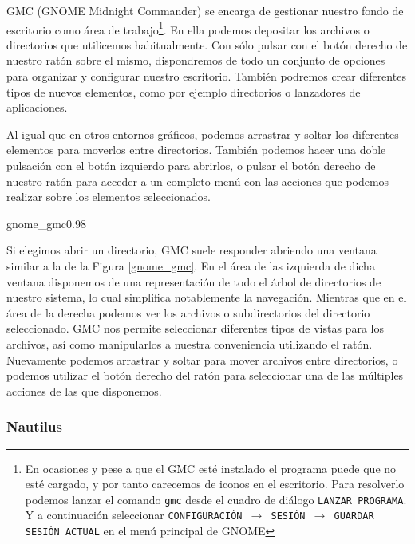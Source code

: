 {\sf GMC (GNOME  Midnight Commander)} se encarga  de gestionar nuestro
fondo de escritorio como área  de trabajo\footnote{En ocasiones y pese
a  que el  {\sf GMC}  esté  instalado el  programa puede  que no  esté
cargado,  y por  tanto  carecemos  de iconos  en  el escritorio.  Para
resolverlo  podemos  lanzar  el  comando {\tt  gmc}  desde  el  cuadro
de  diálogo  {\tt  LANZAR  PROGRAMA}.  Y  a  continuación  seleccionar
{\tt CONFIGURACIÓN  $\rightarrow$ SESIÓN $\rightarrow$  GUARDAR SESIÓN
ACTUAL}  en  el  menú  principal  de {\sf  GNOME}}.  En  ella  podemos
depositar los archivos o directorios que utilicemos habitualmente. Con
sólo pulsar  con el  botón derecho  de nuestro  ratón sobre  el mismo,
dispondremos  de  todo  un  conjunto  de  opciones  para  organizar  y
configurar nuestro escritorio. También podremos crear diferentes tipos
de  nuevos elementos,  como por  ejemplo directorios  o lanzadores  de
aplicaciones.

Al igual  que en otros  entornos gráficos, podemos arrastrar  y soltar
los  diferentes elementos  para  moverlos  entre directorios.  También
podemos  hacer  una  doble  pulsación  con  el  botón  izquierdo  para
abrirlos, o pulsar el botón derecho de nuestro ratón para acceder a un
completo  menú  con  las  acciones  que  podemos  realizar  sobre  los
elementos seleccionados.

\begin{figura}{gnome_gmc}{0.98}
\caption{GNOME Midnight Commander}
\label{gnome_gmc}
\end{figura}

Si elegimos  abrir un directorio,  {\sf GMC} suele  responder abriendo
una ventana similar  a la de la Figura \ref{gnome_gmc}.  En el área de
las izquierda  de dicha  ventana disponemos  de una  representación de
todo el  árbol de directorios  de nuestro sistema, lo  cual simplifica
notablemente  la navegación.  Mientras que  en el  área de  la derecha
podemos ver los archivos o subdirectorios del directorio seleccionado.
{\sf GMC} nos permite seleccionar  diferentes tipos de vistas para los
archivos, así  como manipularlos a nuestra  conveniencia utilizando el
ratón. Nuevamente podemos arrastrar y soltar para mover archivos entre
directorios,  o  podemos utilizar  el  botón  derecho del  ratón  para
seleccionar una de las múltiples acciones de las que disponemos.

\subsubsection{Nautilus}

